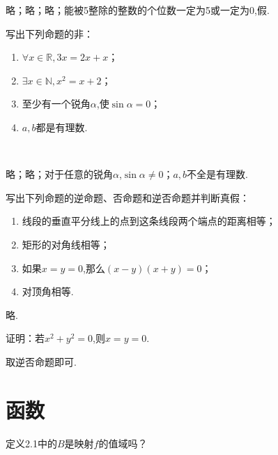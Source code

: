 \documentclass[lang=cn,newtx,10pt,scheme=chinese]{elegantbook}
\begin{document}
\begin{solution}
  略；略；略；能被5整除的整数的个位数一定为5或一定为0,假.
\end{solution}

\begin{exercise}
  写出下列命题的非：
\end{exercise}

\begin{enumerate}
  \item $\forall x\in\mathbb{R},3x=2x+x$；
  \item $\exists x\in\mathbb{N},x^2=x+2$；
  \item 至少有一个锐角$\alpha$,使$\sin\alpha=0$；
  \item $a,b$都是有理数.
\end{enumerate}\

\begin{solution}
  略；略；对于任意的锐角$\alpha$,$\sin\alpha\neq 0$；$a,b$不全是有理数.
\end{solution}

\begin{exercise}
  写出下列命题的逆命题、否命题和逆否命题并判断真假：
\end{exercise}

\begin{enumerate}
  \item 线段的垂直平分线上的点到这条线段两个端点的距离相等；
  \item 矩形的对角线相等；
  \item 如果$x=y=0$,那么$(x-y)(x+y)=0$；
  \item 对顶角相等.
\end{enumerate}

\begin{solution}
  略.
\end{solution}

\begin{exercise}\label{2003RJA_xx2-1_P7.exp4}
  证明：若$x^2+y^2=0$,则$x=y=0$.
\end{exercise}

\begin{solution}
  取逆否命题即可.
\end{solution}

\chapter{函数}

\begin{exercise}
  定义2.1中的$B$是映射$f$的值域吗？
\end{exercise}
\end{document}
